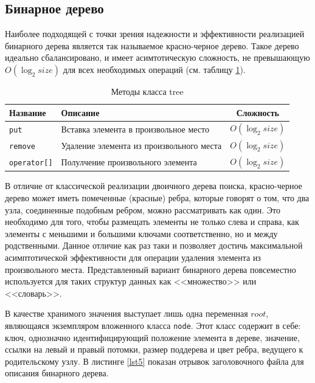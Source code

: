 \documentclass[a4paper,12pt]{article}
\begin{document}
\cleardoublepage

\subsection{Бинарное дерево}

Наиболее подходящей с точки зрения надежности и эффективности реализацией бинарного дерева является так называемое красно-черное дерево.
Такое дерево идеально сбалансировано, и имеет асимтотическую сложность, не превышающую $O(\log_2 size)$ для всех необходимых операций (см. таблицу \ref{comp2}).

\begin{table}[H]
	\caption{Методы класса tree}
	\begin{center}
		\begin{tabular}{|l|l|c|}\hline\label{comp2}
			Название & Описание & Сложность \\ \hline
			\verb!put! & Вставка элемента в произвольное место & $O(\log_2 size)$ \\ \hline
			\verb!remove! & Удаление элемента из произвольного места & $O(\log_2 size)$ \\ \hline
			\verb!operator[]! & Полулчение произвольного элемента & $O(\log_2 size)$ \\ \hline
		\end{tabular}
	\end{center}
\end{table}

В отличие от классической реализации двоичного дерева поиска, красно-черное дерево может иметь помеченные (красные) ребра, которые говорят о том, что два узла, соединенные подобным ребром, можно рассматривать как один.
Это необходимо для того, чтобы размещать элементы не только слева и справа, как элементы с меньшими и большими ключами соответственно, но и между родственными.
Данное отличие как раз таки и позволяет достичь максимальной асимптотической эффективности для операции удаления элемента из произвольного места.
Представленный вариант бинарного дерева повсеместно используется для таких структур данных как <<множество>> или <<словарь>>.

В качестве хранимого значения выступает лишь одна переменная $root$, являющаяся экземпляром вложенного класса \verb!node!.
Этот класс содержит в себе: ключ, однозначно идентифицирующий положение элемента в дереве, значение, ссылки на левый и правый потомки, размер поддерева и цвет ребра, ведущего к родительскому узлу.
В листинге \ref{lst5} показан отрывок заголовочного файла для описания бинарного дерева.
\end{document}
